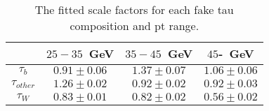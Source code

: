 \begin{table}
\caption{The fitted scale factors for each fake tau composition and pt range.}
\centering
\begin{tabular}{|c|c|c|c|} \hline
 & $25-35$~GeV & $35-45$~GeV & $45$-~GeV\\\hline
$\tau_{b}$ & $0.91\pm0.06$ & $1.37\pm0.07$ & $1.06\pm0.06$\\\hline
$\tau_{other}$ & $1.26\pm0.02$ & $0.92\pm0.02$ & $0.92\pm0.03$\\\hline
$\tau_{W}$ & $0.83\pm0.01$ & $0.82\pm0.02$ & $0.56\pm0.02$\\\hline
\end{tabular}
\label{tab:scale_factor}
\end{table}
